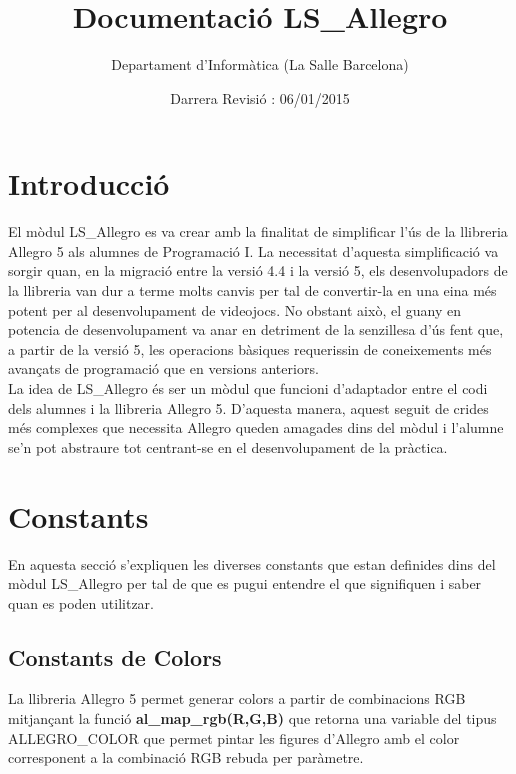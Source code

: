 \documentclass[11pt]{article}
\title{Documentació LS\_Allegro}
\author{Departament d'Informàtica (La Salle Barcelona)}
\date{Darrera Revisió : 06/01/2015}
\begin{document}
\begin{titlepage}
\clearpage\maketitle
\thispagestyle{empty}
\newpage
\clearpage\tableofcontents
\thispagestyle{empty}
\end{titlepage}


\newpage


\section{Introducció}
El mòdul LS\_Allegro es va crear amb la finalitat de simplificar l'ús de la llibreria Allegro 5 als alumnes de Programació I. La necessitat d'aquesta simplificació va sorgir quan, en la migració entre la versió 4.4 i la versió 5, els desenvolupadors de la llibreria van dur a terme molts canvis per tal de convertir-la en una eina més potent per al desenvolupament de videojocs. No obstant això, el guany en potencia de desenvolupament va anar en detriment de la senzillesa d'ús fent que, a partir de la versió 5, les operacions bàsiques requerissin de coneixements més avançats de programació que en versions anteriors.\\

\noindent La idea de LS\_Allegro és ser un mòdul que funcioni d'adaptador entre el codi dels alumnes i la llibreria Allegro 5. D'aquesta manera, aquest seguit de crides més complexes que necessita Allegro queden amagades dins del mòdul i l'alumne se'n pot abstraure tot centrant-se en el desenvolupament de la pràctica.

\section{Constants}
En aquesta secció s'expliquen les diverses constants que estan definides dins del mòdul LS\_Allegro per tal de que es pugui entendre el que signifiquen i saber quan es poden utilitzar.

\subsection{Constants de Colors}
La llibreria Allegro 5 permet generar colors a partir de combinacions RGB mitjançant la funció \textbf{al\_map\_rgb(R,G,B)} que retorna una variable del tipus ALLEGRO\_COLOR que permet pintar les figures d'Allegro amb el color corresponent a la combinació RGB rebuda per paràmetre.\\
\end{document}
